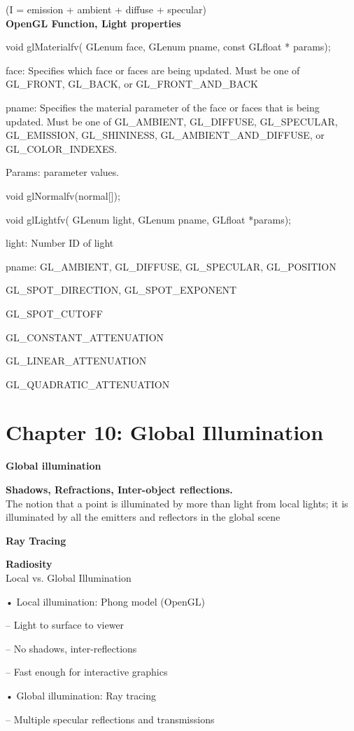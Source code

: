 \documentclass[]{report}
\begin{document}
(I = emission + ambient + diffuse + specular)\\
\textbf{OpenGL Function, Light properties}

void glMaterialfv( GLenum face, GLenum pname, const GLfloat
* params);

face: Specifies which face or faces are being updated. Must be one of
GL\_FRONT, GL\_BACK, or GL\_FRONT\_AND\_BACK

pname: Specifies the material parameter of the face or faces that is
being updated. Must be one of GL\_AMBIENT, GL\_DIFFUSE,
GL\_SPECULAR, GL\_EMISSION, GL\_SHININESS,
GL\_AMBIENT\_AND\_DIFFUSE, or GL\_COLOR\_INDEXES.

Params: parameter values.

void glNormalfv(normal[]);

void glLightfv( GLenum light, GLenum pname, GLfloat *params);

light: Number ID of light

pname: GL\_AMBIENT, GL\_DIFFUSE, GL\_SPECULAR, GL\_POSITION

GL\_SPOT\_DIRECTION, GL\_SPOT\_EXPONENT

GL\_SPOT\_CUTOFF

GL\_CONSTANT\_ATTENUATION

GL\_LINEAR\_ATTENUATION

GL\_QUADRATIC\_ATTENUATION


\section*{Chapter 10: Global Illumination}
\textbf{Global illumination}

\textbf{Shadows, Refractions, Inter-object reflections.}\\
The notion that a point is illuminated by more than
light from local lights; it is illuminated by all the
emitters and reflectors in the global scene

\textbf{Ray Tracing}

\textbf{Radiosity}\\
Local vs. Global Illumination

• Local illumination: Phong model (OpenGL)

– Light to surface to viewer

– No shadows, inter-reflections

– Fast enough for interactive graphics

• Global illumination: Ray tracing

– Multiple specular reflections and transmissions
\end{document}
